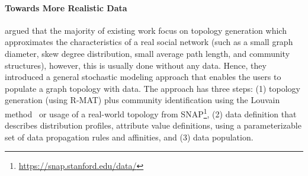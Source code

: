 \paragraph{Towards More Realistic Data} \cite{Nettleton2016} argued that the majority of existing work focus on
topology generation which approximates the characteristics of a real social
network (such as a small graph diameter, skew degree
distribution, small average path length, and community structures), however,  this is usually done without any data. Hence, they
introduced a general stochastic modeling approach that enables the users to
populate a graph topology with data. The approach has three steps: (1) topology
generation (using R-MAT) plus community identification using the Louvain
method~\cite{1742-5468-2008-10-P10008} or usage of a real-world topology from
SNAP\footnote{\url{https://snap.stanford.edu/data/}}, (2) data definition
that describes distribution profiles, attribute value definitions, using a
parameterizable set of data propagation rules and affinities, and (3) data
population.


